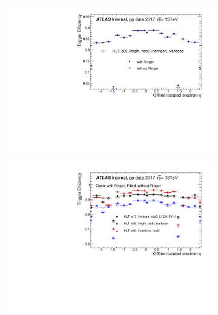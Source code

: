 \begin{figure}[h!tb]
\begin{subfigure}[c]{.49\textwidth}
  \centering
  \includegraphics[width=\textwidth]{sections/03_operation/figures/efficiencies/eff_EGAM1_e28_ringer_and_noringer_2017_after_ts1_HLT_eta.pdf}
  \caption{}
  \end{subfigure}
  \begin{subfigure}[c]{.49\textwidth}
  \centering
  \includegraphics[width=\textwidth]{sections/03_operation/figures/efficiencies/eff_EGAM1_e17_e26_e60_2017_before_and_after_ts1_eta.pdf}
  \caption{}%
  \end{subfigure} \\
  \begin{subfigure}[c]{.49\textwidth}
  \centering

\end{subfigure}
\end{figure}
